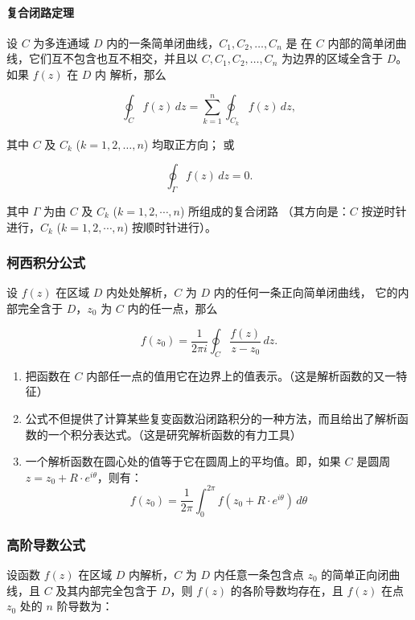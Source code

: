 \paragraph{复合闭路定理}
\label{复合闭路定理}
设 \(C\) 为多连通域 \(D\) 内的一条简单闭曲线，\(C_1, C_2, \ldots, C_n\) 是
在 \(C\) 内部的简单闭曲线，它们互不包含也互不相交，并且以
\(C, C_1, C_2, \ldots, C_n\) 为边界的区域全含于 \(D\)。如果 \(f(z)\) 在 \(D\) 内
解析，那么

\[
\oint_{C} f(z) \, dz = \sum_{k=1}^{n} \oint_{C_k} f(z) \, dz,
\]

其中 \(C\) 及 \(C_k\) (\(k = 1, 2, \ldots, n\)) 均取正方向； 或

\[
\oint_{\Gamma} f(z) \, dz = 0.
\]

其中 \(\Gamma\) 为由 \(C\) 及 \(C_k\) (\(k = 1, 2, \cdots, n\)) 所组成的复合闭路
（其方向是：\(C\) 按逆时针进行，\(C_k\) (\(k = 1, 2, \cdots, n\)) 按顺时针进行）。
\subsubsection{柯西积分公式}
\label{柯西积分公式}
设 \(f(z)\) 在区域 \(D\) 内处处解析，\(C\) 为 \(D\) 内的任何一条正向简单闭曲线，
它的内部完全含于 \(D\)，\(z_0\) 为 \(C\) 内的任一点，那么

\[
f(z_{0}) = \frac{1}{2\pi i} \oint_{C} \frac{f(z)}{z - z_{0}} \, dz.
\]

\begin{tcolorbox}[title={说明},colback=red!5!white
,colframe=red!75!black
,colbacktitle=yellow!50!red
,coltitle=red!25!black, fonttitle=\bfseries,subtitle style={boxrule=0.4pt, colback=yellow!50!red!25!white}]
\begin{enumerate}
\item 把函数在 \(C\) 内部任一点的值用它在边界上的值表示。（这是解析函数的又一特征）
\item 公式不但提供了计算某些复变函数沿闭路积分的一种方法，而且给出了解析函数的一个积分表达式。（这是研究解析函数的有力工具）
\item 一个解析函数在圆心处的值等于它在圆周上的平均值。即，如果 \(C\) 是圆周 \(z = z_{0} + R \cdot e^{i\theta}\)，则有：
$$
    f(z_{0}) = \frac{1}{2\pi} \int_{0}^{2\pi} f(z_{0} + R \cdot e^{i\theta}) \, d\theta
    $$
\end{enumerate}

\end{tcolorbox}
\subsubsection{高阶导数公式}
\label{高阶导数公式}
设函数 \(f(z)\) 在区域 \(D\) 内解析，\(C\) 为 \(D\) 内任意一条包含点 \(z_0\) 的简单正向闭曲线，且 \(C\) 及其内部完全包含于 \(D\)，则 \(f(z)\)
的各阶导数均存在，且 \(f(z)\) 在点 \(z_0\) 处的 \(n\) 阶导数为：

